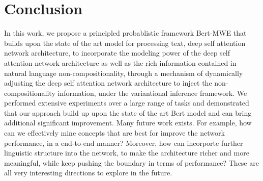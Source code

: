 \documentclass[conference]{IEEEtran}
\newcommand{\BertMWE}{\mbox{\sf Bert-MWE}\xspace}
\begin{document}
\section{Conclusion}
In this work, 
we propose a principled probablistic framework \BertMWE that builds upon the state of the art 
model for processing text, 
deep self attention network architecture, 
to incorporate the modeling power of the deep self attention network architecture as well as the rich information contained in natural language non-compositionality, 
through a mechanism of 
dynamically adjusting the deep self attention network architecture to inject the non-compositionality information, 
under the variantional inference framework. We performed extensive experiments over a large range of tasks and demonstrated that our approach build up upon the state of the art Bert model and can bring additional significant improvement.
Many future work exists. For example, how can we effectively mine concepts that are best for improve the network performance, in a end-to-end manner? Moreover, how can incorporte further linguistic structure into the network, to make the architecture richer and more meaningful, while keep pushing the boundary in terms of performance? These are all very interesting directions to explore in the future.




\balance



\end{document}

